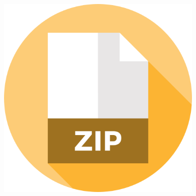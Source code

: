 \documentclass{beamer}
\begin{document}
\begin{frame}
\begin{columns}
		\centering
		\begin{figure}
			\includegraphics[width=0.88\textwidth]{figures/zip.png}
		\end{figure} 
	\end{columns}
\end{frame}
\end{document}
